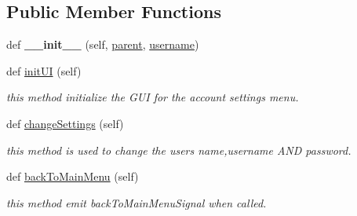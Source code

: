 \subsection*{Public Member Functions}
\begin{DoxyCompactItemize}
\item 
\hypertarget{classsrc_1_1settings__menu_1_1_account_settings_menu_a4b199df6972058b64e123acda02b72a5}{}def {\bfseries \+\_\+\+\_\+init\+\_\+\+\_\+} (self, \hyperlink{classsrc_1_1settings__menu_1_1_account_settings_menu_afe50b3829d1054937762620263272c4b}{parent}, \hyperlink{classsrc_1_1settings__menu_1_1_account_settings_menu_a54d0681d7b2c05bc084bf686a5e0cf41}{username})\label{classsrc_1_1settings__menu_1_1_account_settings_menu_a4b199df6972058b64e123acda02b72a5}

\item 
def \hyperlink{classsrc_1_1settings__menu_1_1_account_settings_menu_aeff3b2a6031f6dd312a66d0f161eeedb}{init\+U\+I} (self)
\begin{DoxyCompactList}\small\item\em this method initialize the G\+U\+I for the account settings menu. \end{DoxyCompactList}\item 
def \hyperlink{classsrc_1_1settings__menu_1_1_account_settings_menu_a10989536edbbe0db4fc03f2e5ccc8271}{change\+Settings} (self)
\begin{DoxyCompactList}\small\item\em this method is used to change the user\textquotesingle{}s name,username A\+N\+D password. \end{DoxyCompactList}\item 
def \hyperlink{classsrc_1_1settings__menu_1_1_account_settings_menu_a47dc6e6cb8a9ca5431a32ad73298ed81}{back\+To\+Main\+Menu} (self)
\begin{DoxyCompactList}\small\item\em this method emit back\+To\+Main\+Menu\+Signal when called. \end{DoxyCompactList}\end{DoxyCompactItemize}
